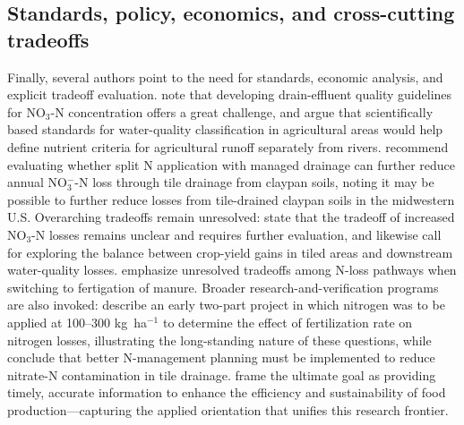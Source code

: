 \subsection{Standards, policy, economics, and cross-cutting tradeoffs}
Finally, several authors point to the need for standards, economic analysis, and explicit tradeoff evaluation. \textcite{Elmi2004} note that developing drain-effluent quality guidelines for NO$_3$-N concentration offers a great challenge, and \textcite{Lagzdins2015} argue that scientifically based standards for water-quality classification in agricultural areas would help define nutrient criteria for agricultural runoff separately from rivers. \textcite{Nash2015d} recommend evaluating whether split N application with managed drainage can further reduce annual NO$_3^-$-N loss through tile drainage from claypan soils, noting it may be possible to further reduce losses from tile-drained claypan soils in the midwestern U.S. Overarching tradeoffs remain unresolved: \textcite{Derby2024} state that the tradeoff of increased NO$_3$-N losses remains unclear and requires further evaluation, and \textcite{Addab2022} likewise call for exploring the balance between crop-yield gains in tiled areas and downstream water-quality losses. \textcite{Gamble2018} emphasize unresolved tradeoffs among N-loss pathways when switching to fertigation of manure. Broader research-and-verification programs are also invoked: \textcite{BAKER1975} describe an early two-part project in which nitrogen was to be applied at 100--300 kg~ha$^{-1}$ to determine the effect of fertilization rate on nitrogen losses, illustrating the long-standing nature of these questions, while \textcite{Dattamudi2020} conclude that better N-management planning must be implemented to reduce nitrate-N contamination in tile drainage. \textcite{Fontes2019} frame the ultimate goal as providing timely, accurate information to enhance the efficiency and sustainability of food production---capturing the applied orientation that unifies this research frontier.